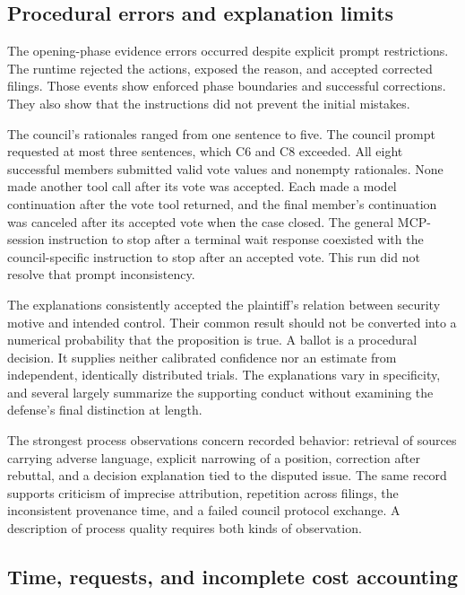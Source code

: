 \documentclass[11pt]{article}
\begin{document}
\subsection{Procedural errors and explanation limits}

The opening-phase evidence errors occurred despite explicit prompt restrictions.  The runtime rejected the actions, exposed the reason, and accepted corrected filings.  Those events show enforced phase boundaries and successful corrections.  They also show that the instructions did not prevent the initial mistakes.

The council's rationales ranged from one sentence to five.  The council prompt requested at most three sentences, which C6 and C8 exceeded.  All eight successful members submitted valid vote values and nonempty rationales.  None made another tool call after its vote was accepted.  Each made a model continuation after the vote tool returned, and the final member's continuation was canceled after its accepted vote when the case closed.  The general MCP-session instruction to stop after a terminal wait response coexisted with the council-specific instruction to stop after an accepted vote.  This run did not resolve that prompt inconsistency.

The explanations consistently accepted the plaintiff's relation between security motive and intended control.  Their common result should not be converted into a numerical probability that the proposition is true.  A ballot is a procedural decision.  It supplies neither calibrated confidence nor an estimate from independent, identically distributed trials.  The explanations vary in specificity, and several largely summarize the supporting conduct without examining the defense's final distinction at length.

The strongest process observations concern recorded behavior: retrieval of sources carrying adverse language, explicit narrowing of a position, correction after rebuttal, and a decision explanation tied to the disputed issue.  The same record supports criticism of imprecise attribution, repetition across filings, the inconsistent provenance time, and a failed council protocol exchange.  A description of process quality requires both kinds of observation.

\subsection{Time, requests, and incomplete cost accounting}
\end{document}
